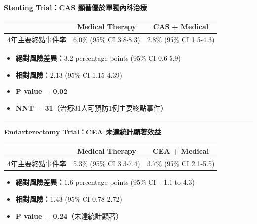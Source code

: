 \documentclass[12pt,a4paper]{article}
\begin{document}
\begin{tcolorbox}[colback=yellow!10!white,colframe=orange!75!black,title=\textbf{主要結果摘要}]

\textbf{\large Stenting Trial：CAS 顯著優於單獨內科治療}

\begin{center}
\begin{tabular}{lcc}
\toprule
& \textbf{Medical Therapy} & \textbf{CAS + Medical} \\
\midrule
4年主要終點事件率 & 6.0\% (95\% CI 3.8-8.3) & 2.8\% (95\% CI 1.5-4.3) \\
\bottomrule
\end{tabular}
\end{center}

\begin{itemize}[noitemsep]
    \item \textbf{絕對風險差異：}3.2 percentage points (95\% CI 0.6-5.9)
    \item \textbf{相對風險：}2.13 (95\% CI 1.15-4.39)
    \item \textbf{P value = 0.02}
    \item \textbf{NNT = 31}（治療31人可預防1例主要終點事件）
\end{itemize}

\vspace{0.3cm}
\hrule
\vspace{0.3cm}

\textbf{\large Endarterectomy Trial：CEA 未達統計顯著效益}

\begin{center}
\begin{tabular}{lcc}
\toprule
& \textbf{Medical Therapy} & \textbf{CEA + Medical} \\
\midrule
4年主要終點事件率 & 5.3\% (95\% CI 3.3-7.4) & 3.7\% (95\% CI 2.1-5.5) \\
\bottomrule
\end{tabular}
\end{center}

\begin{itemize}[noitemsep]
    \item \textbf{絕對風險差異：}1.6 percentage points (95\% CI $-$1.1 to 4.3)
    \item \textbf{相對風險：}1.43 (95\% CI 0.78-2.72)
    \item \textbf{P value = 0.24}（未達統計顯著）
\end{itemize}

\end{tcolorbox}
\end{document}
